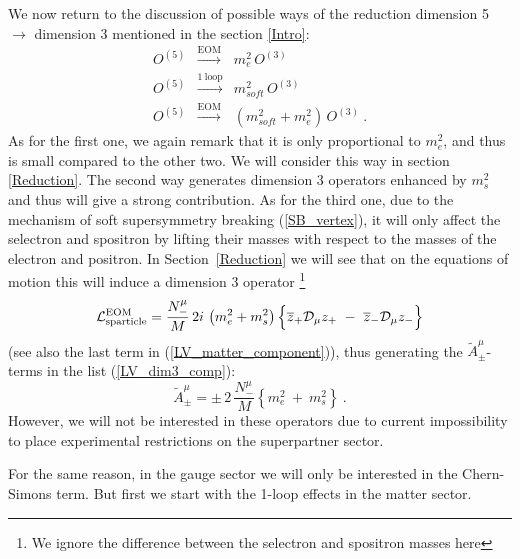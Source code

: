 \documentclass[a4paper,12pt]{article}
\begin{document}
	We now return to the discussion of possible ways of
	the reduction dimension 5 $ \to $ dimension 3 mentioned in the
	section \ref{Intro}:
\begin{eqnarray*}
\nonumber 
	O^{(5)} & \stackrel{\mathrm {EOM}}{\longrightarrow} &
			  m_e^2\, O^{(3)} \\
\nonumber
	O^{(5)} & \stackrel{\mathrm {1\ loop}}{\longrightarrow} &
			  m_{soft}^2\, O^{(3)} \\
\nonumber
	O^{(5)} & \stackrel{\mathrm {EOM}}{\longrightarrow} &
			  (m_{soft}^2 + m_e^2)\, O^{(3)}~.
\end{eqnarray*}
	As for the first one, we again remark that it is only proportional
	to $ m_e^2 $, and thus is small compared to the other two.
	We will consider this way in section \ref{Reduction}.
	The second way generates dimension 3 operators enhanced by
	$ m_s^2 $ and thus will give a strong contribution.
	As for the third one, due to the mechanism of soft supersymmetry
	breaking (\ref{SB_vertex}), it will only affect the
	selectron and spositron by lifting their masses with
	respect to the masses of the electron and positron.
	In Section~\ref{Reduction} we will see that on the
	equations of motion this will induce a dimension 3 operator
\footnote{
	We ignore the difference between the selectron and spositron
	masses here
	}
\begin{equation}
	  \mathcal{L}_{\rm sparticle}^{\rm EOM} = 
	\frac{N_-^\mu}{M}\, 2 i\, 
	\left(
		m_e^2 + m_s^2
	\right)
	\Bigl\{ 
		\overline{z}_+ \mathcal{D}_\mu z_+ 
		~-~
		\overline{z}_- \mathcal{D}_\mu z_- 
	\Bigr\}
\end{equation}
	(see also the last term in (\ref{LV_matter_component})),
	thus generating the $ \widetilde{A}^\mu_\pm $-terms in 
	the list (\ref{LV_dim3_comp}):
\begin{equation}
	\widetilde{A}_\pm^\mu = 
	\pm\, 2\, \frac{N_-^\mu}
                        { M }   
	\left\{
		m_e^2 ~+~ m_s^2
	\right\}~.
\end{equation}
	However, we will not be interested in these operators 
	due to current impossibility to place
	experimental restrictions on the superpartner sector. 

	For the same reason, in the gauge sector we will only be interested
	in the Chern-Simons term.
	But first we start with the 1-loop effects in the matter sector.
\end{document}
